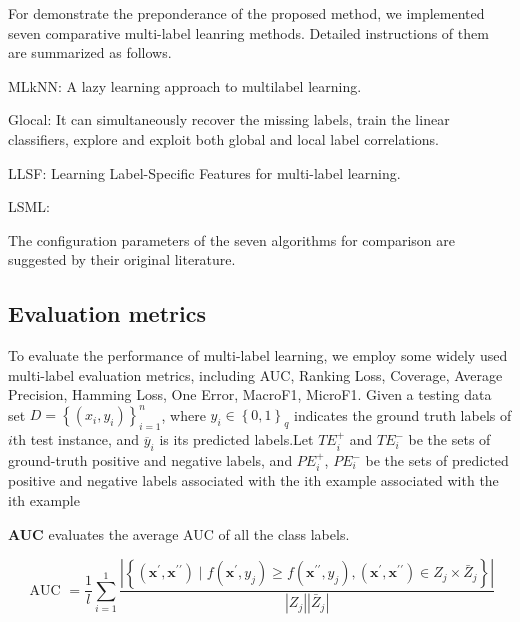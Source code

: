 \documentclass[final,3p,times]{elsarticle}
\begin{document}
For demonstrate the preponderance of the proposed method, we implemented seven comparative multi-label leanring methods. Detailed instructions of them are summarized as follows.




\begin{spacing}{1.5}
	
	MLkNN: A lazy learning approach to multilabel learning.
	
	Glocal: It can simultaneously recover the missing labels, train the linear classifiers, explore and exploit both global and local label correlations.
	
	LLSF: Learning Label-Specific Features for multi-label learning.
	
	LSML:

	
\end{spacing}

The configuration parameters of the seven algorithms for comparison are suggested by their original literature. 



\subsection{Evaluation metrics}

To evaluate the performance of multi-label learning, we employ some widely used multi-label evaluation metrics, including AUC, Ranking Loss, Coverage, Average Precision, Hamming Loss, One Error, MacroF1, MicroF1. Given a testing data set $D=\left\{\left(x_{i},y_{i}\right)\right\}_{i=1}^{n}$, where $y_{i} \in \left\{0, 1 \right\}_q$ indicates the ground truth labels of $i$th test instance, and ${\overline{y}_{i}}$ is its predicted labels.Let  $TE_{i}^{+}$ and $TE_{i}^{-}$ be the sets of ground-truth positive and negative labels, and $PE_{i}^{+}$, $PE_{i}^{-}$ be the sets of predicted positive and negative labels associated with the ith example associated with the ith example 

\textbf{AUC} evaluates the average AUC of all the class labels.

\begin{equation}
	\text { AUC }=\frac{1}{l} \sum_{i=1}^{1} \frac{\left|\left\{\left(\mathbf{x}^{\prime}, \mathbf{x}^{\prime \prime}\right) \mid f\left(\mathbf{x}^{\prime}, y_{j}\right) \geq f\left(\mathbf{x}^{\prime \prime}, y_{j}\right),\left(\mathbf{x}^{\prime}, \mathbf{x}^{\prime \prime}\right) \in Z_{j} \times \bar{Z}_{j}\right\}\right|}{\left|Z_{j}\right|\left|\bar{Z}_{j}\right|}
\end{equation}
\end{document}
